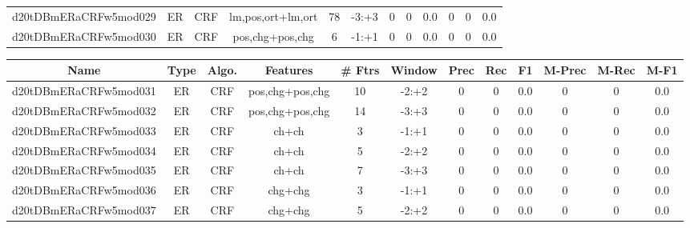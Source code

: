 \documentclass[a4paper]{article}
\begin{document}
\begin{landscape}
\begin{center}
\begin{tabular}{ |c|c|c|c|c|c|c|c|c|c|c|c|}
 
 	
 	\small{ d20tDBmERaCRFw5mod029 } & ER & CRF & lm,pos,ort+lm,ort  &  78 &  -3:+3  &  0 & 0 & 0.0  &  0 & 0 & 0.0 \\
 	

 
 	
 	\small{ d20tDBmERaCRFw5mod030 } & ER & CRF & pos,chg+pos,chg  &  6 &  -1:+1  &  0 & 0 & 0.0  &  0 & 0 & 0.0 \\
 	
 \hline
\end{tabular}
\end{center}




\begin{center}
\begin{tabular}{ |c|c|c|c|c|c|c|c|c|c|c|c|} 
 \hline
 	Name & Type & Algo. & Features & \# Ftrs & Window & Prec & Rec & F1 & M-Prec & M-Rec & M-F1\\
 \hline

 	

 
 	
 	\small{ d20tDBmERaCRFw5mod031 } & ER & CRF & pos,chg+pos,chg  &  10 &  -2:+2  &  0 & 0 & 0.0  &  0 & 0 & 0.0 \\
 	

 
 	
 	\small{ d20tDBmERaCRFw5mod032 } & ER & CRF & pos,chg+pos,chg  &  14 &  -3:+3  &  0 & 0 & 0.0  &  0 & 0 & 0.0 \\
 	

 
 	
 	\small{ d20tDBmERaCRFw5mod033 } & ER & CRF & ch+ch  &  3 &  -1:+1  &  0 & 0 & 0.0  &  0 & 0 & 0.0 \\
 	

 
 	
 	\small{ d20tDBmERaCRFw5mod034 } & ER & CRF & ch+ch  &  5 &  -2:+2  &  0 & 0 & 0.0  &  0 & 0 & 0.0 \\
 	

 
 	
 	\small{ d20tDBmERaCRFw5mod035 } & ER & CRF & ch+ch  &  7 &  -3:+3  &  0 & 0 & 0.0  &  0 & 0 & 0.0 \\
 	

 
 	
 	\small{ d20tDBmERaCRFw5mod036 } & ER & CRF & chg+chg  &  3 &  -1:+1  &  0 & 0 & 0.0  &  0 & 0 & 0.0 \\
 	

 
 	
 	\small{ d20tDBmERaCRFw5mod037 } & ER & CRF & chg+chg  &  5 &  -2:+2  &  0 & 0 & 0.0  &  0 & 0 & 0.0 \\
 	


\end{tabular}
\end{center}
\end{landscape}
\end{document}
